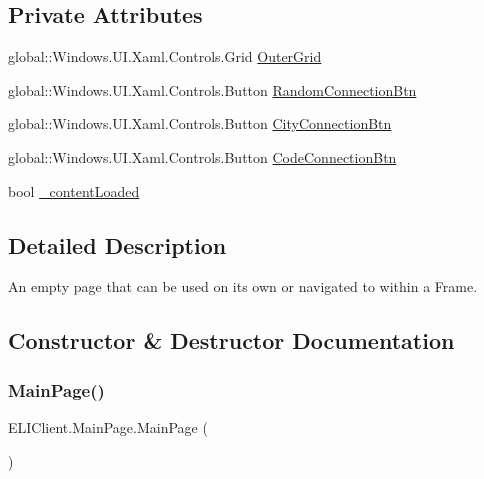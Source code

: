 \subsection*{Private Attributes}
\begin{DoxyCompactItemize}
\item 
global\+::\+Windows.\+U\+I.\+Xaml.\+Controls.\+Grid \hyperlink{class_e_l_i_client_1_1_main_page_aee58d4fb694b56ccf086c9e0430eb191}{Outer\+Grid}
\item 
global\+::\+Windows.\+U\+I.\+Xaml.\+Controls.\+Button \hyperlink{class_e_l_i_client_1_1_main_page_ad6458c6cc001948318a368508367b473}{Random\+Connection\+Btn}
\item 
global\+::\+Windows.\+U\+I.\+Xaml.\+Controls.\+Button \hyperlink{class_e_l_i_client_1_1_main_page_a4779791c2de61403ee9f5caa9726dde5}{City\+Connection\+Btn}
\item 
global\+::\+Windows.\+U\+I.\+Xaml.\+Controls.\+Button \hyperlink{class_e_l_i_client_1_1_main_page_aeaa715ecc3cfcc76b4362888ddd160ae}{Code\+Connection\+Btn}
\item 
bool \hyperlink{class_e_l_i_client_1_1_main_page_a4b09df4baf8d708dcb7c1d09e2bba3ae}{\+\_\+content\+Loaded}
\end{DoxyCompactItemize}


\subsection{Detailed Description}
An empty page that can be used on its own or navigated to within a Frame. 



\subsection{Constructor \& Destructor Documentation}
\mbox{\label{class_e_l_i_client_1_1_main_page_ae4c43f0abef6a296bfb0896e2b0dce55}} 
\subsubsection{\texorpdfstring{Main\+Page()}{MainPage()}}
{\footnotesize\ttfamily E\+L\+I\+Client.\+Main\+Page.\+Main\+Page (\begin{DoxyParamCaption}{ }\end{DoxyParamCaption})\hspace{0.3cm}{\ttfamily [inline]}}



